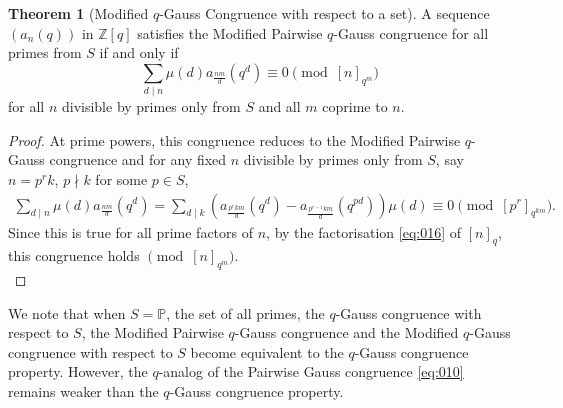 \documentclass{article}
\numberwithin{equation}{section}
\theoremstyle{definition}
\newtheorem{theorem}[definition]{\bf {Theorem}}
\begin{document}
\begin{theorem}[Modified $q$-Gauss Congruence with respect to a set]  
    A sequence $(a_n(q))$ in $\mathbb{Z}[q]$ satisfies the Modified Pairwise $q$-Gauss congruence for all primes from $S$ if and only if
    \begin{equation}\label{eq:032}
        \sum_{d\mid n}\mu(d)a_\frac{nm}{d}(q^d)\equiv 0\pmod{[n]_{q^m}}
    \end{equation}
    for all $n$ divisible by primes only from $S$ and all $m$ coprime to $n$.
\end{theorem}
\begin{proof}
At prime powers, this congruence reduces to the Modified Pairwise $q$-Gauss congruence and for any fixed $n$ divisible by primes only from $S$, say $n=p^rk$, $p\nmid k$ for some $p\in S$,  
\begin{align*}
    \sum_{d\mid n}\mu(d)a_\frac{nm}{d}(q^d)=\sum_{d\mid k}\left(a_\frac{p^rkm}{d}(q^d)-a_\frac{p^{r-1}km}{d}(q^{pd})\right)\mu(d)\equiv0\pmod{[p^r]_{q^{km}}}\text{.}
\end{align*}
Since this is true for all prime factors of $n$, by the factorisation \eqref{eq:016} of $[n]_q$, this congruence holds $\pmod{[n]_{q^m}}$.\\
\end{proof}

We note that when $S=\mathbb{P}$, the set of all primes, the $q$-Gauss congruence with respect to $S$,  the Modified Pairwise $q$-Gauss congruence and the Modified $q$-Gauss congruence with respect to $S$ become equivalent to the $q$-Gauss congruence property. However, the $q$-analog of the Pairwise Gauss congruence \eqref{eq:010} remains weaker than the $q$-Gauss congruence property. 
\end{document}
